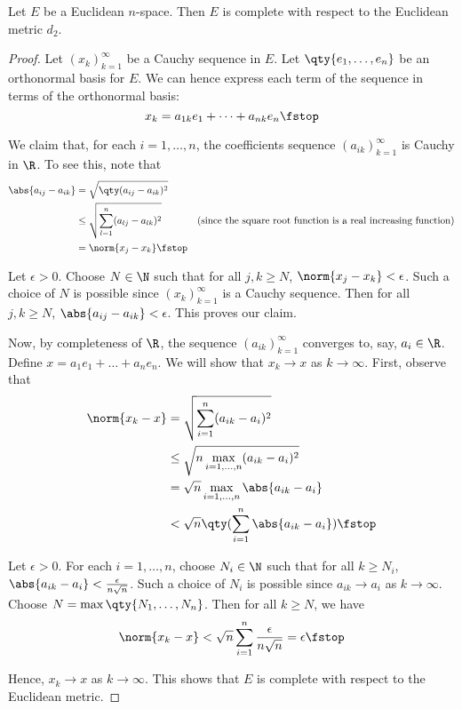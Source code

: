 \begin{theorem}
  Let \( E \) be a Euclidean \( n \)-space. Then \( E \) is complete with respect to the Euclidean metric \( d_2 \).
\end{theorem}
\begin{proof}
  Let \( (x_k)_{k=1}^\infty \) be a Cauchy sequence in \( E \). Let \( \qty{e_1,\dots,e_n} \) be an orthonormal basis for \( E \). We can hence express each term of the sequence in terms of the orthonormal basis:
  \[ x_k=a_{1k}e_1+\dots+a_{nk}e_n\fstop \]
  
  We claim that, for each \( i=1,\dots,n \), the coefficients sequence \( (a_{ik})_{k=1}^\infty \) is Cauchy in \( \R \). To see this, note that
  \begin{align*}
    \abs{a_{ij}-a_{ik}}&=\sqrt{\qty(a_{ij}-a_{ik})^2}\\
    &\leq \sqrt{\sum_{l=1}^n (a_{lj}-a_{lk})^2} &(\text{since the square root function is a real increasing function})\\
    &= \norm{x_j-x_k}\fstop
  \end{align*}

  Let \( \epsilon>0 \). Choose \( N\in\N \) such that for all \( j,k\geq N \), \( \norm{x_j-x_k}<\epsilon \). Such a choice of \( N \) is possible since \( (x_k)_{k=1}^\infty \) is a Cauchy sequence. Then for all \( j,k\geq N \), \( \abs{a_{ij}-a_{ik}}<\epsilon \). This proves our claim.

  \vspace{3mm}

  Now, by completeness of \( \R \), the sequence \( (a_{ik})_{k=1}^\infty \) converges to, say, \( a_i\in\R \). Define \( x=a_1e_1+\dots+a_ne_n \). We will show that \( x_k\to x \) as \(k\to\infty  \). First, observe that
  \begin{align*}
    \norm{x_k-x}&= \sqrt{\sum_{i=1}^n(a_{ik}-a_i)^2}\\
    &\leq \sqrt{n\max_{i=1,\dots,n}(a_{ik}-a_i)^2}\\
    &= \sqrt{n}\max_{i=1,\dots,n}\abs{a_{ik}-a_i}\\
    &<\sqrt{n}\qty(\sum_{i=1}^n\abs{a_{ik}-a_i})\fstop
  \end{align*}

  Let \( \epsilon>0 \). For each \( i=1,\dots,n \), choose \( N_i\in\N \) such that for all \( k\geq N_i \), \( \abs{a_{ik}-a_i}<\frac{\epsilon}{n\sqrt{n}} \). Such a choice of \( N_i \) is possible since \( a_{ik}\to a_i \) as \( k\to\infty \). Choose \( N=\max\qty{N_1,\dots,N_n} \). Then for all \( k\geq N \), we have
  \[ \norm{x_k-x}<\sqrt{n}\sum_{i=1}^n\frac{\epsilon}{n\sqrt{n}}=\epsilon\fstop \]
  
  Hence, \( x_k\to x \) as \( k\to\infty \). This shows that \( E \) is complete with respect to the Euclidean metric.
\end{proof}

